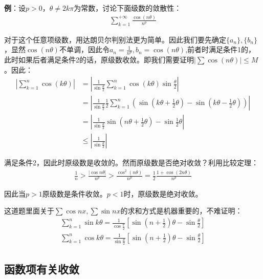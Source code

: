 \documentclass{ctexart}
\let\oldtextbf\textbf
\renewcommand{\textbf}[1]{\textcolor{brown!50!red}{\oldtextbf{#1}}}
\begin{document}
\textbf{\color{brown!50!red}例}：设$p>0，\theta\neq 2k\pi$为常数，讨论下面级数的敛散性：
\begin{align*}
    \sum_{k=1}^{+\infty}\frac{\cos(n\theta)}{n^p}
\end{align*}

对于这个任意项级数，用达朗贝尔判别法更为简单。因此我们要先确定$\{a_n\},\{b_n\}$，显然$\cos(n\theta)$不单调，因此令$a_n=\frac{1}{n^p},b_n=\cos(n\theta)$,前者时满足条件1的，此时如果后者满足条件2的话，原级数收敛。即我们需要证明$|\sum \cos(n\theta)|\leq M$。因此：
\begin{align*} 
 |\sum_{k=1}^n \cos(k\theta)|&=|\frac{1}{\sin\frac{\theta}{2}}\sum_{k=1}^n \cos(k\theta)
\sin\frac{\theta}{2}|\\&=\left|\frac{1}{\sin\frac{\theta}{2}}\frac{1}{2} \sum_{k=1}^n 
\left(\sin(k\theta+\frac{1}{2}\theta)- \sin(k\theta-\frac{1}{2}\theta)\right)\right|\\
&=\left|\frac{1}{\sin\frac{\theta}{2}}\sin(n\theta+\frac{1}{2}\theta)-\sin\frac{1}{2}\theta \right|
\\&\leq\left|\frac{1}{\sin\frac{\theta}{2}}\right|
\end{align*}

满足条件2，因此时原级数是收敛的。然而原级数是否绝对收敛？利用比较定理：
\begin{align*} 
\frac{1}{n}>\frac{|\cos n\theta|}{n^p}>\frac{\cos^2(n\theta)}{n^p}=\frac{1}{2} \frac{1+\cos(2n\theta)}{n^p}   
\end{align*}

因此当$p>1$原级数是条件收敛。$p<1$时，原级数是绝对收敛。
\begin{tcolorbox}[
    colback=bac1,     %
    colframe=fra1,   %
    coltitle=white!80,    
    coltext=tex1,%
    title=注意,
    fonttitle=\bfseries,        %
arc=2mm,                     %
breakable
]
这道题里面关于$\sum \cos nx,\sum \sin nx$的求和方式是机器重要的，不难证明：
\begin{align*}
    \sum_{k=1}^n \sin k\theta=\frac{1}{\cos\frac{\theta}{2}}[\sin(n+\frac{1}{2})\theta-\sin\frac{\theta}{2}]\\
     \sum_{k=1}^n \cos k\theta=\frac{1}{\sin\frac{\theta}{2}}[\sin(n+\frac{1}{2})\theta-\sin\frac{\theta}{2}]
\end{align*}
\end{tcolorbox}

\subsection{函数项有关收敛}
\end{document}
